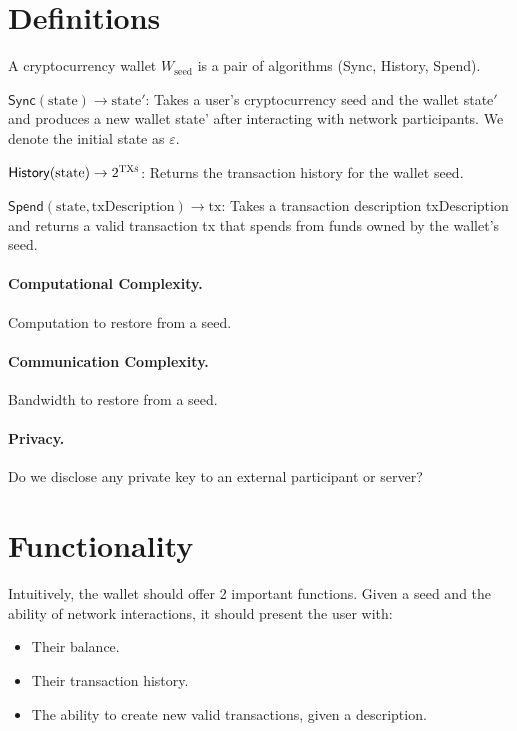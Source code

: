 \documentclass[sigconf]{acmart}
\begin{document}
\section{Definitions}
\begin{definition}
    A cryptocurrency wallet $W_\text{seed}$ is a pair of algorithms (\textsf{Sync}, \textsf{History}, \textsf{Spend}).
    
    $\mathsf{Sync}(\text{state}) \rightarrow \text{state}'$: Takes a user's cryptocurrency seed and the wallet state$'$ and produces a new wallet state' after interacting with network participants. We denote the initial state as $\varepsilon$.
    
    $\mathsf{History}(\text{state}) \rightarrow 2^\textsc{TXs}$: Returns the transaction history for the wallet seed.
    
    $\mathsf{Spend}(\text{state}, \text{txDescription}) \rightarrow \text{tx}$: Takes a transaction description txDescription and returns a valid transaction tx that spends from funds owned by the wallet's seed.
\end{definition}

\paragraph{Computational Complexity.} Computation to restore from a seed.
\paragraph{Communication Complexity.} Bandwidth to restore from a seed.
\paragraph{Privacy.} Do we disclose any private key to an external participant or server?

\section{Functionality}
Intuitively, the wallet should offer 2 important functions. Given a seed and the ability of network interactions, it should present the user with:

\begin{itemize}
    \item Their balance.
    \item Their transaction history.
    \item The ability to create new valid transactions, given a description.
\end{itemize}
\end{document}

